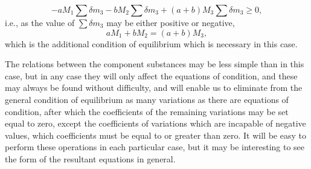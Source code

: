 \documentclass[11pt]{article}
\begin{document}
\begin{equation}
-aM_1\sum\delta m_3-bM_2\sum\delta m_3
+(a+b)M_3\sum\delta m_3\geq 0,
\end{equation}
i.e., as the value of \(\sum\delta m_3\) may be either positive or negative,
\begin{equation}
aM_1+bM_2=(a+b)M_3,
\end{equation}
which is the additional condition of equilibrium which is necessary in this case.

The relations between the component substances may be less simple than in this case, but in any case they will only affect the equations of condition, and these may always be found without difficulty, and will enable us to eliminate from the general condition of equilibrium as many variations as there are equations of condition, after which the coefficients of the remaining variations may be set equal to zero, except the coefficients of variations which are incapable of negative values, which coefficients must be equal to or greater than zero. It will be easy to perform these operations in each particular case, but it may be interesting to see the form of the resultant equations in general.
\end{document}
